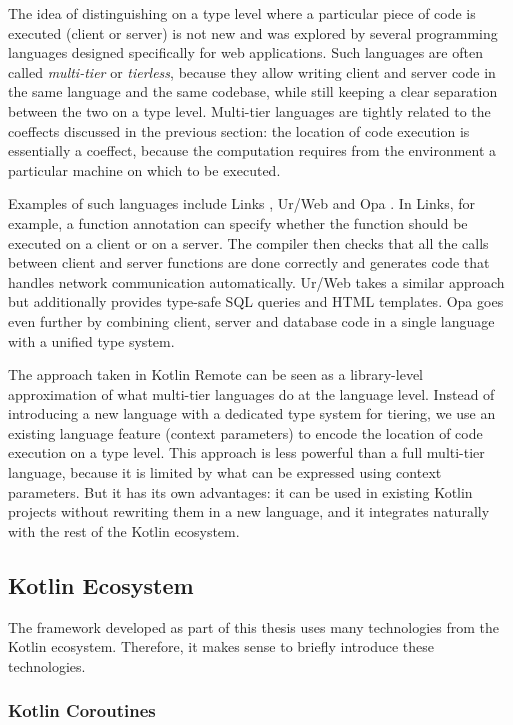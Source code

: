 \documentclass[a4paper,11pt,oneside]{article}
\newcommand{\term}[1]{\textit{#1}}
\begin{document}
The idea of distinguishing on a type level where a particular piece of code is executed (client or
server) is not new and was explored by several programming languages designed specifically for
web applications. Such languages are often called \term{multi-tier} or \term{tierless}, because
they allow writing client and server code in the same language and the same codebase, while still
keeping a clear separation between the two on a type level. Multi-tier languages are tightly related
to the coeffects discussed in the previous section: the location of code execution is essentially a
coeffect, because the computation requires from the environment a particular machine on which to be executed.

Examples of such languages include Links \cite{cooper_links_2007}, Ur/Web
\cite{chlipala_urweb_2015} and Opa \cite{noauthor_opa_nodate}. In Links, for example, a function
annotation can specify whether the function should be executed on a client or on a server. The compiler
then checks that all the calls between client and server functions are done correctly and
generates code that handles network communication automatically. Ur/Web takes a similar approach but
additionally provides type-safe SQL queries and HTML templates. Opa goes even further by combining
client, server and database code in a single language with a unified type system.

The approach taken in Kotlin Remote can be seen as a library-level approximation of what multi-tier
languages do at the language level. Instead of introducing a new language with a dedicated type system
for tiering, we use an existing language feature (context parameters) to encode the location of code
execution on a type level. This approach is less powerful than a full multi-tier language,
because it is limited by what can be expressed using context parameters. But it has its own
advantages: it can be used in existing Kotlin projects without rewriting them in a new language,
and it integrates naturally with the rest of the Kotlin ecosystem.

\subsection{Kotlin Ecosystem}
The framework developed as part of this thesis uses many technologies from the Kotlin ecosystem.
Therefore, it makes sense to briefly introduce these technologies.

\subsubsection{Kotlin Coroutines}
\end{document}
